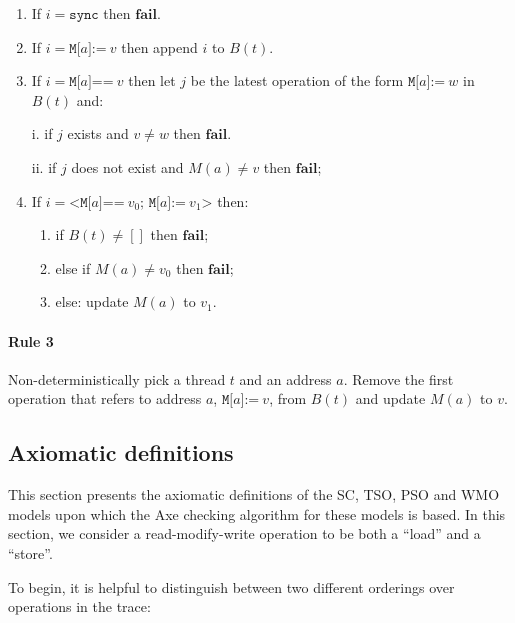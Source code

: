 \documentclass[11pt]{article}
\begin{document}
\begin{enumerate}
\item 
     If $i = \texttt{sync}$ then $\textbf{fail}$.

\item 
     If $i = \texttt{M[}a\texttt{]:=}~v$ then append $i$ to $B(t)$.

\item 
     If $i = \texttt{M[}a\texttt{]==}~v$ then let $j$ be the latest
     operation of the form $\texttt{M[}a\texttt{]:=}~w$ in
     $B(t)$ and:
     
       i.   if $j$ exists and $v \neq w$ then $\textbf{fail}$.

       ii.  if $j$ does not exist and $M(a) \neq v$ then $\textbf{fail}$;

\item
     If $i = \texttt{<M[}a\texttt{]==}~v_0\texttt{; M[}a\texttt{]:=}~v_1
     \texttt{>}$ then:

\begin{enumerate}[i]
\item
           if $B(t) \neq []$ then $\textbf{fail}$;

\item
           else if $M(a) \neq v_0$ then $\textbf{fail}$;

\item
           else: update $M(a)$ to $v_1$.
\end{enumerate}
\end{enumerate}

\paragraph{Rule 3}

Non-deterministically pick a thread $t$ and an address $a$.  Remove
the first operation that refers to address $a$,
$\texttt{M[}a\texttt{]:=}~v$, from $B(t)$ and update $M(a)$ to $v$.

\subsection{Axiomatic definitions}

This section presents the axiomatic definitions of the SC, TSO, PSO and
WMO models upon which the Axe checking algorithm for these
models is based.  In this section, we consider a read-modify-write
operation to be both a ``load'' and a ``store''.

To begin, it is helpful to distinguish between two different orderings
over operations in the trace:
\end{document}
